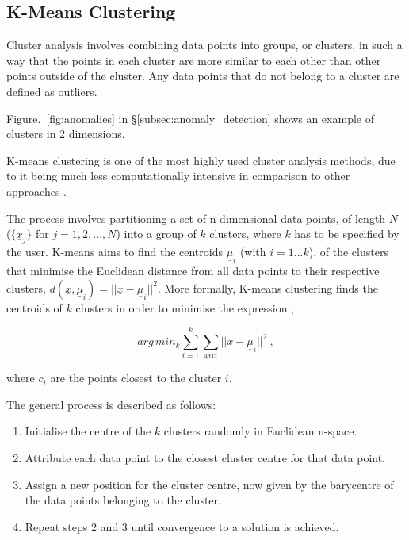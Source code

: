 \subsection{K-Means Clustering}
\label{subsec:kmeans}

Cluster analysis involves combining data points into groups, or clusters, in such a way that the points in each cluster are more similar to each other than other points outside of the cluster. Any data points that do not belong to a cluster are defined as outliers. 

Figure.~\ref{fig:anomalies} in \S\ref{subsec:anomaly_detection} shows an example of clusters in 2 dimensions. 

K-means clustering is one of the most highly used cluster analysis methods, due to it being much less computationally intensive in comparison to other approaches \cite{Kanungo:2002:EKC:628329.628801}.

The process involves partitioning a set of n-dimensional data points, of length $N$ ($\{\underline{x}_j\}$ for $j=1,2,...,N$) into a group of $k$ clusters, where $k$ has to be specified by the user. K-means aims to find the centroids $\underline{\mu}_i$ (with $i=1...k$), of the clusters that minimise the Euclidean distance from all data points to their respective clusters, $d(\underline{x}, \underline{\mu}_i) = ||\underline{x}-\underline{\mu}_i||^2$. More formally, K-means clustering finds the centroids of $k$ clusters in order to minimise the expression \cite{596afe3f2b5a4ff3b8f4f9793ad2f4ee},

\begin{equation}
    arg\,min_k \sum_{i=1}^{k} \sum_{\underline{x} \epsilon c_i} ||\underline{x}-\underline{\mu}_i||^2 ~,
    \label{eq:K-means}
\end{equation}

where $c_i$ are the points closest to the cluster $i$.

The general process is described as follows:
\begin{enumerate}
    \item Initialise the centre of the $k$ clusters randomly in Euclidean n-space.
    \item Attribute each data point to the closest cluster centre for that data point. 
    \item Assign a new position for the cluster centre, now given by the barycentre of the data points belonging to the cluster.
    \item Repeat steps 2 and 3 until convergence to a solution is achieved.
\end{enumerate}

